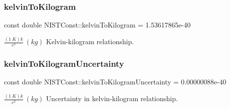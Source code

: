 \subsubsection{\texorpdfstring{kelvin\+To\+Kilogram}{kelvinToKilogram}}
{\footnotesize\ttfamily const double N\+I\+S\+T\+Const\+::kelvin\+To\+Kilogram = 1.\+53617865e-\/40}

$\frac{(1\ K)k}{c^2} \ (kg)$ Kelvin-\/kilogram relationship. \mbox{\label{group___n_i_s_t_const-_kelvin_gaa6783c525ec480ef30ad433a44bb5f33}} 
\subsubsection{\texorpdfstring{kelvin\+To\+Kilogram\+Uncertainty}{kelvinToKilogramUncertainty}}
{\footnotesize\ttfamily const double N\+I\+S\+T\+Const\+::kelvin\+To\+Kilogram\+Uncertainty = 0.\+00000088e-\/40}

$\frac{(1\ K)k}{c^2} \ (kg)$ Uncertainty in kelvin-\/kilogram relationship. 